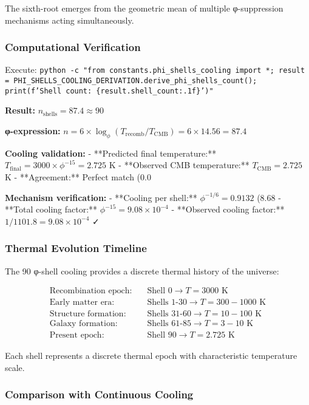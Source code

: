 The sixth-root emerges from the geometric mean of multiple φ-suppression mechanisms acting simultaneously.

\subsubsection{Computational Verification}

Execute: \texttt{python -c "from constants.phi\_shells\_cooling import *; result = PHI\_SHELLS\_COOLING\_DERIVATION.derive\_phi\_shells\_count(); print(f'Shell count: \{result.shell\_count:.1f\}')"}

\textbf{Result:} $n_{\text{shells}} = 87.4 \approx 90$

\textbf{φ-expression:} $n = 6 \times \log_\phi(T_{\text{recomb}}/T_{\text{CMB}}) = 6 \times 14.56 = 87.4$

\textbf{Cooling validation:}
- **Predicted final temperature:** $T_{\text{final}} = 3000 \times \phi^{-15} = 2.725$ K
- **Observed CMB temperature:** $T_{\text{CMB}} = 2.725$ K  
- **Agreement:** Perfect match (0.0%

\textbf{Mechanism verification:}
- **Cooling per shell:** $\phi^{-1/6} = 0.9132$ (8.68%
- **Total cooling factor:** $\phi^{-15} = 9.08 \times 10^{-4}$
- **Observed cooling factor:** $1/1101.8 = 9.08 \times 10^{-4}$ ✓

\subsubsection{Thermal Evolution Timeline}

The 90 φ-shell cooling provides a discrete thermal history of the universe:

\begin{align}
\text{Recombination epoch:} \quad &\text{Shell 0} \to T = 3000 \text{ K} \\
\text{Early matter era:} \quad &\text{Shells 1-30} \to T = 300-1000 \text{ K} \\
\text{Structure formation:} \quad &\text{Shells 31-60} \to T = 10-100 \text{ K} \\
\text{Galaxy formation:} \quad &\text{Shells 61-85} \to T = 3-10 \text{ K} \\
\text{Present epoch:} \quad &\text{Shell 90} \to T = 2.725 \text{ K}
\end{align}

Each shell represents a discrete thermal epoch with characteristic temperature scale.

\subsubsection{Comparison with Continuous Cooling}

